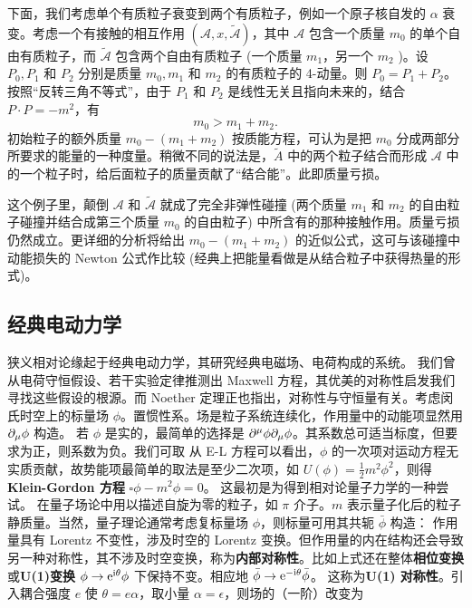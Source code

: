 下面，我们考虑单个有质粒子衰变到两个有质粒子，例如一个原子核自发的 $\alpha$ 衰变。考虑一个有接触的相互作用 $(\mathcal{A},x,\widetilde{\mathcal{A}})$，其中 $\mathcal{A}$ 包含一个质量 $m_{0}$ 的单个自由有质粒子，而 $\widetilde{\mathcal{A}}$ 包含两个自由有质粒子 (一个质量 $m_{1}$，另一个 $m_{2}$ )。设 $P_{0},P_{1}$ 和 $P_{2}$ 分别是质量 $m_{0},m_{1}$ 和 $m_{2}$ 的有质粒子的 4-动量。则 $P_{0}=P_{1}+P_{2}$。按照“反转三角不等式”，由于 $P_{1}$ 和 $P_{2}$ 是线性无关且指向未来的，结合 $P\cdot P=-m^2$，有
\[m_{0}>m_{1}+m_{2}.\]
初始粒子的额外质量 $m_{0}-\left(m_{1}+m_{2}\right)$ 按质能方程，可认为是把 $m_{0}$ 分成两部分所要求的能量的一种度量。稍微不同的说法是，$\widetilde{A}$ 中的两个粒子结合而形成 $\mathcal{A}$ 中的一个粒子时，给后面粒子的质量贡献了“结合能”。此即质量亏损。

这个例子里，颠倒 $\mathcal{A}$ 和 $\widetilde{\mathcal{A}}$ 就成了完全非弹性碰撞 (两个质量 $m_{1}$ 和 $m_{2}$ 的自由粒子碰撞并结合成第三个质量 $m_{0}$ 的自由粒子) 中所含有的那种接触作用。质量亏损仍然成立。更详细的分析将给出 $m_{0}-\left(m_{1}+m_{2}\right)$ 的近似公式，这可与该碰撞中动能损失的 Newton 公式作比较 (经典上把能量看做是从结合粒子中获得热量的形式)。

\subsection{经典电动力学}

狭义相对论缘起于经典电动力学，其研究经典电磁场、电荷构成的系统。
我们曾从电荷守恒假设、若干实验定律推测出 Maxwell 方程，其优美的对称性启发我们寻找这些假设的根源。而 Noether 定理正也指出，对称性与守恒量有关。考虑闵氏时空上的标量场 $\phi$。置惯性系。场是粒子系统连续化，作用量中的动能项显然用 $\partial_\mu\phi$ 构造。
若 $\phi$ 是实的，最简单的选择是 $\partial^\mu\phi\partial_\mu\phi$。其系数总可适当标度，但要求为正，则系数为负。我们可取
从 E-L 方程可以看出，$\phi$ 的一次项对运动方程无实质贡献，故势能项最简单的取法是至少二次项，如 $U(\phi)=\frac 12 m^2\phi^2$，则得\textbf{Klein-Gordon 方程} $\square\phi-m^2\phi=0$。
这最初是为得到相对论量子力学的一种尝试。
在量子场论中用以描述自旋为零的粒子，如 $\pi$ 介子。$m$ 表示量子化后的粒子静质量。当然，量子理论通常考虑复标量场 $\phi$，则标量可用其共轭 $\bar\phi$ 构造：
作用量具有 Lorentz 不变性，涉及时空的 Lorentz 变换。但作用量的内在结构还会导致另一种对称性，其不涉及时空变换，称为\textbf{内部对称性}。比如上式还在整体\textbf{相位变换}或\textbf{U(1)变换} $\phi \to \mathrm{e}^{\mathrm{i} \theta} \phi$ 下保持不变。相应地 $\bar{\phi} \to \mathrm{e}^{-\mathrm{i} \theta} \bar{\phi}$。
这称为\textbf{U(1) 对称性}。引入耦合强度 $e$ 使 $\theta=e\alpha$，取小量 $\alpha=\epsilon$，则场的（一阶）改变为

